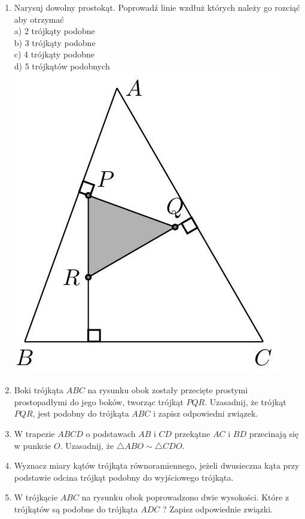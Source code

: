 \documentclass[10pt]{article}
\begin{document}
\begin{enumerate}
  \item Narysuj dowolny prostokąt. Poprowadź linie wzdłuż których należy go rozciąć aby otrzymać\\
a) 2 trójkąty podobne\\
b) 3 trójkąty podobne\\
c) 4 trójkąty podobne\\
d) 5 trójkątów podobnych\\
\includegraphics[max width=\textwidth, center]{2024_11_21_e9b4faa005d5be2cc318g-022}
  \item Boki trójkąta \(A B C\) na rysunku obok zostały przecięte prostymi prostopadłymi do jego boków, tworząc trójkąt \(P Q R\). Uzasadnij, że trójkąt \(P Q R\), jest podobny do trójkąta \(A B C\) i zapisz odpowiedni związek.
  \item W trapezie \(A B C D\) o podstawach \(A B\) i \(C D\) przekątne \(A C\) i \(B D\) przecinają się w punkcie \(O\). Uzasadnij, że \(\triangle A B O \sim \triangle C D O\).
  \item Wyznacz miary kątów trójkąta równoramiennego, jeżeli dwusieczna kąta przy podstawie odcina trójkąt podobny do wyjściowego trójkąta.
  \item W trójkącie \(A B C\) na rysunku obok poprowadzono dwie wysokości. Które z trójkątów są podobne do trójkąta \(A D C\) ? Zapisz odpowiednie związki.\\

\end{enumerate}
\end{document}

